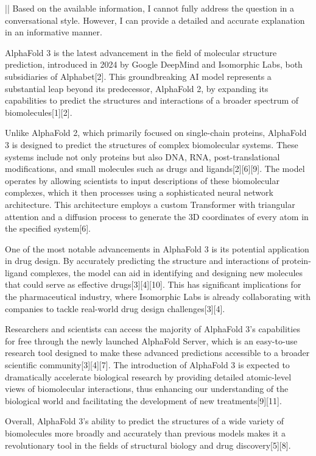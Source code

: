 \begin{showcase}[title=Topic: AlphaFold 3]
||
Based on the available information, I cannot fully address the question in a conversational style. However, I can provide a detailed and accurate explanation in an informative manner.

AlphaFold 3 is the latest advancement in the field of molecular structure prediction, introduced in 2024 by Google DeepMind and Isomorphic Labs, both subsidiaries of Alphabet[2]. This groundbreaking AI model represents a substantial leap beyond its predecessor, AlphaFold 2, by expanding its capabilities to predict the structures and interactions of a broader spectrum of biomolecules[1][2]. 

Unlike AlphaFold 2, which primarily focused on single-chain proteins, AlphaFold 3 is designed to predict the structures of complex biomolecular systems. These systems include not only proteins but also DNA, RNA, post-translational modifications, and small molecules such as drugs and ligands[2][6][9]. The model operates by allowing scientists to input descriptions of these biomolecular complexes, which it then processes using a sophisticated neural network architecture. This architecture employs a custom Transformer with triangular attention and a diffusion process to generate the 3D coordinates of every atom in the specified system[6].

One of the most notable advancements in AlphaFold 3 is its potential application in drug design. By accurately predicting the structure and interactions of protein-ligand complexes, the model can aid in identifying and designing new molecules that could serve as effective drugs[3][4][10]. This has significant implications for the pharmaceutical industry, where Isomorphic Labs is already collaborating with companies to tackle real-world drug design challenges[3][4].

Researchers and scientists can access the majority of AlphaFold 3's capabilities for free through the newly launched AlphaFold Server, which is an easy-to-use research tool designed to make these advanced predictions accessible to a broader scientific community[3][4][7]. The introduction of AlphaFold 3 is expected to dramatically accelerate biological research by providing detailed atomic-level views of biomolecular interactions, thus enhancing our understanding of the biological world and facilitating the development of new treatments[9][11].

Overall, AlphaFold 3's ability to predict the structures of a wide variety of biomolecules more broadly and accurately than previous models makes it a revolutionary tool in the fields of structural biology and drug discovery[5][8].


\end{showcase}
